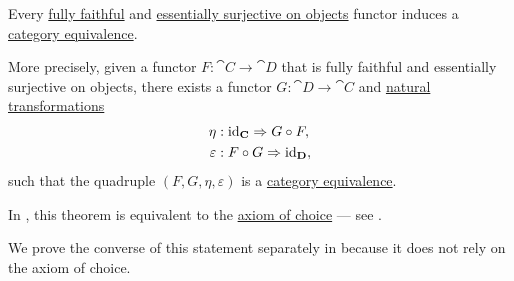 \begin{theorem}\label{thm:fully_faithful_and_essentially_surjective_functor_induces_equivalence}
  Every \hyperref[def:functor_invertibility/fully_faithful]{fully faithful} and \hyperref[def:functor_invertibility/surjective_on_objects]{essentially surjective on objects} functor induces a \hyperref[def:category_equivalence]{category equivalence}.

  More precisely, given a functor \( F: \cat{C} \to \cat{D} \) that is fully faithful and essentially surjective on objects, there exists a functor \( G: \cat{D} \to \cat{C} \) and \hyperref[def:natural_transformation]{natural transformations}
  \begin{align*}
    \eta        &: \id_{\cat{C}} \Rightarrow G \bincirc F, \\
    \varepsilon &: F \bincirc G \Rightarrow \id_{\cat{D}},
  \end{align*}
  such that the quadruple \( (F, G, \eta, \varepsilon) \) is a \hyperref[def:category_equivalence]{category equivalence}.

  In \hyperref[def:zfc]{}, this theorem is equivalent to the \hyperref[def:zfc/choice]{axiom of choice} --- see .

  We prove the converse of this statement separately in  because it does not rely on the axiom of choice.
\end{theorem}
